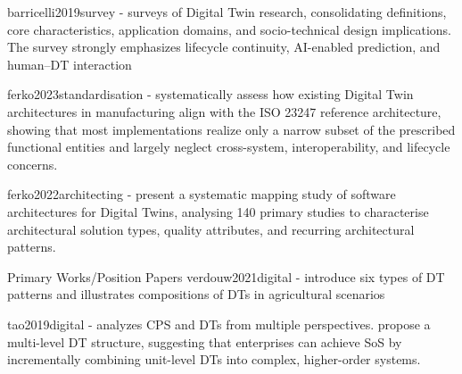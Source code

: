 barricelli2019survey - surveys of Digital Twin research, consolidating definitions, core characteristics, application domains, and socio-technical design implications. The survey strongly emphasizes lifecycle continuity, AI-enabled prediction, and human–DT interaction

ferko2023standardisation - systematically assess how existing Digital Twin architectures in manufacturing align with the ISO 23247 reference architecture, showing that most implementations realize only a narrow subset of the prescribed functional entities and largely neglect cross-system, interoperability, and lifecycle concerns.

ferko2022architecting - present a systematic mapping study of software architectures for Digital Twins, analysing 140 primary studies to characterise architectural solution types, quality attributes, and recurring architectural patterns.


% 





Primary Works/Position Papers
verdouw2021digital - introduce six types of DT patterns and illustrates compositions of DTs in agricultural scenarios

tao2019digital - analyzes CPS and DTs from multiple perspectives. propose a multi-level DT structure, suggesting that enterprises can achieve SoS by incrementally combining unit-level DTs into complex, higher-order systems.

